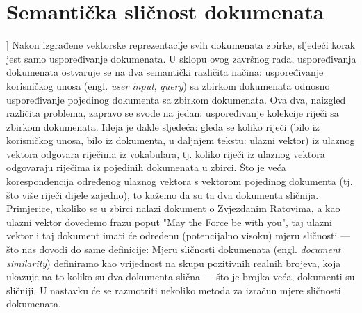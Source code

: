 \documentclass[times, utf8, zavrsni]{fer}
\begin{document}
\section{Semantička sličnost dokumenata}]
\label{subchap:similarity}
Nakon izgrađene vektorske reprezentacije svih dokumenata zbirke, sljedeći korak jest samo uspoređivanje dokumenata. U sklopu ovog završnog rada, uspoređivanja dokumenata ostvaruje se na dva semantički različita načina: uspoređivanje korisničkog unosa (engl. \textit{user input}, \textit{query}) sa zbirkom dokumenata odnosno uspoređivanje pojedinog dokumenta sa zbirkom dokumenata.
Ova dva, naizgled različita problema, zapravo se svode na jedan: uspoređivanje kolekcije riječi sa zbirkom dokumenata. Ideja je dakle sljedeća: gleda se koliko riječi (bilo iz korisničkog unosa, bilo iz dokumenta, u daljnjem tekstu: ulazni vektor) iz ulaznog vektora odgovara riječima iz vokabulara, tj. koliko riječi iz ulaznog vektora odgovaraju riječima iz pojedinih dokumenata u zbirci. Što je veća korespondencija određenog ulaznog vektora s vektorom pojedinog dokumenta (tj. što više riječi dijele zajedno), to kažemo da su ta dva dokumenta sličnija. Primjerice, ukoliko se u zbirci nalazi dokument o Zvjezdanim Ratovima, a kao ulazni vektor dovedemo frazu poput "May the Force be with you", taj ulazni vektor i taj dokument imati će određenu (potencijalno visoku) mjeru sličnosti — što nas dovodi do same definicije:
\newline
Mjeru sličnosti dokumenata (engl. \textit{document similarity}) definiramo kao vrijednost na skupu pozitivnih realnih brojeva, koja ukazuje na to koliko su dva dokumenta slična — što je brojka veća, dokumenti su sličniji.
U nastavku će se razmotriti nekoliko metoda za izračun mjere sličnosti dokumenata.
\end{document}
